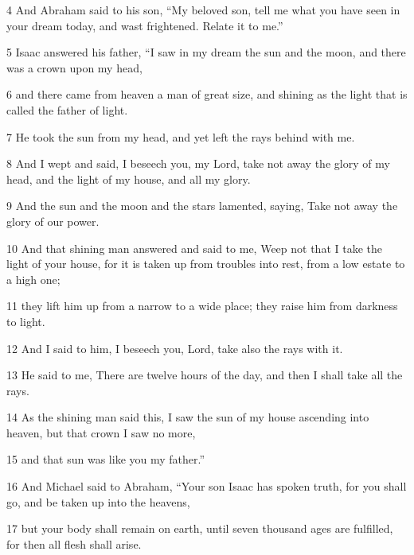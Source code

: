 \par 4 And Abraham said to his son, “My beloved son, tell me what you have seen in your dream today, and wast frightened. Relate it to me.” 

\par 5 Isaac answered his father, “I saw in my dream the sun and the moon, and there was a crown upon my head, 

\par 6 and there came from heaven a man of great size, and shining as the light that is called the father of light. 

\par 7 He took the sun from my head, and yet left the rays behind with me. 

\par 8 And I wept and said, I beseech you, my Lord, take not away the glory of my head, and the light of my house, and all my glory. 

\par 9 And the sun and the moon and the stars lamented, saying, Take not away the glory of our power. 

\par 10 And that shining man answered and said to me, Weep not that I take the light of your house, for it is taken up from troubles into rest, from a low estate to a high one; 

\par 11 they lift him up from a narrow to a wide place; they raise him from darkness to light. 

\par 12 And I said to him, I beseech you, Lord, take also the rays with it. 

\par 13 He said to me, There are twelve hours of the day, and then I shall take all the rays. 

\par 14 As the shining man said this, I saw the sun of my house ascending into heaven, but that crown I saw no more, 

\par 15 and that sun was like you my father.” 

\par 16 And Michael said to Abraham, “Your son Isaac has spoken truth, for you shall go, and be taken up into the heavens, 

\par 17 but your body shall remain on earth, until seven thousand ages are fulfilled, for then all flesh shall arise. 

